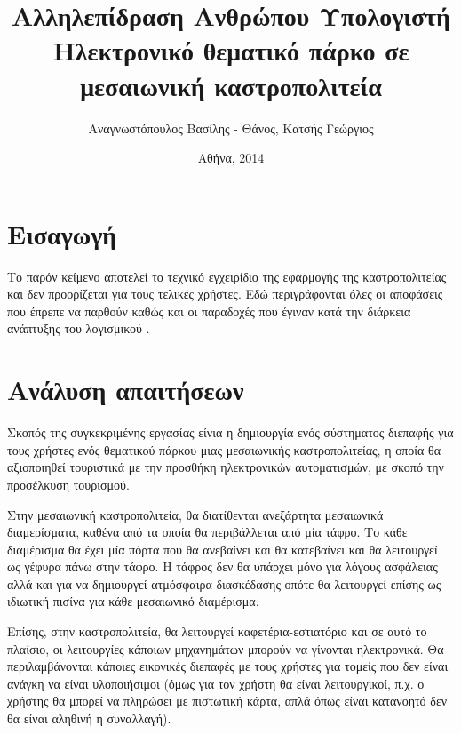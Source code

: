 \documentclass{assignment}
\title{Αλληλεπίδραση Ανθρώπου Υπολογιστή \\ Ηλεκτρονικό θεματικό πάρκο σε μεσαιωνική καστροπολιτεία}
\date{Αθήνα, 2014}
\author{Αναγνωστόπουλος Βασίλης - Θάνος, Κατσής Γεώργιος}
\begin{document}
\maketitle

\setcounter{page}{1} 

\pagestyle{plain}
\tableofcontents
\newpage
\listoffigures
\listoftables
\newpage


\pagestyle{fancy}
\setcounter{page}{1} 

\section{Εισαγωγή}

Το παρόν κείμενο αποτελεί το τεχνικό εγχειρίδιο της εφαρμογής της καστροπολιτείας και δεν προορίζεται για τους τελικές χρήστες. Εδώ περιγράφονται όλες οι αποφάσεις που έπρεπε να παρθούν καθώς και οι παραδοχές που έγιναν κατά την διάρκεια ανάπτυξης του λογισμικού .

\section{Ανάλυση απαιτήσεων}

Σκοπός της συγκεκριμένης εργασίας είνια η δημιουργία ενός σύστηματος διεπαφής για τους χρήστες ενός θεματικού πάρκου μιας μεσαιωνικής καστροπολιτείας, η οποία θα αξιοποιηθεί τουριστικά με την προσθήκη ηλεκτρονικών αυτοματισμών, με σκοπό την προσέλκυση τουρισμού.

Στην μεσαιωνική καστροπολιτεία, θα διατίθενται ανεξάρτητα μεσαιωνικά διαμερίσματα, καθένα από τα οποία θα περιβάλλεται από μία τάφρο. Το κάθε διαμέρισμα θα έχει μία πόρτα που θα ανεβαίνει και θα κατεβαίνει και θα λειτουργεί ως γέφυρα πάνω στην τάφρο. Η τάφρος δεν θα υπάρχει μόνο για λόγους ασφάλειας αλλά και για να δημιουργεί ατμόσφαιρα διασκέδασης οπότε θα λειτουργεί επίσης ως ιδιωτική πισίνα για κάθε μεσαιωνικό διαμέρισμα.

Επίσης, στην καστροπολιτεία, θα λειτουργεί καφετέρια-εστιατόριο και σε αυτό το πλαίσιο, οι λειτουργίες κάποιων μηχανημάτων μπορούν να γίνονται ηλεκτρονικά. Θα περιλαμβάνονται κάποιες εικονικές διεπαφές με τους χρήστες για τομείς που δεν είναι ανάγκη να είναι υλοποιήσιμοι (όμως για τον χρήστη θα είναι λειτουργικοί, π.χ. ο χρήστης θα μπορεί να πληρώσει με πιστωτική κάρτα, απλά όπως είναι κατανοητό δεν θα είναι αληθινή η συναλλαγή).  
\end{document}
